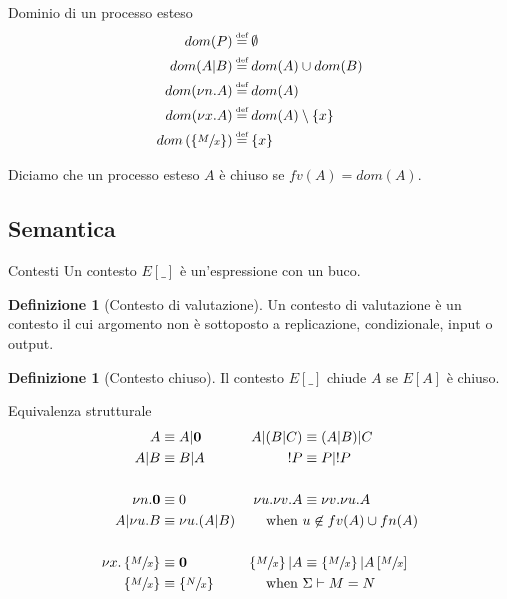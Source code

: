 \documentclass{beamer}
\newcounter{counter1}
\theoremstyle{plain}
\theoremstyle{definition}
\newtheorem{mydef}[counter1]{Definizione}
\theoremstyle{remark}
\newcommand{\set}[1]{\left\{#1\right\}}
\newcommand{\pa}[1]{\left(#1\right)}
\newcommand{\bra}[1]{\left[#1\right]}
\newcommand*{\eqdef}{\ensuremath{\overset{\mathclap{\text{\tiny def}}}{=}}}
\begin{document}
\begin{frame}{Dominio di un processo esteso}
  \begin{align*}
    dom(P) & \eqdef \emptyset \\
    dom(A|B) & \eqdef dom(A) \cup dom(B) \\
    dom(\nu n.A) & \eqdef dom(A) \\
    dom(\nu x.A) & \eqdef dom(A) \setminus \set{x}\\
    dom\pa{ \set{ \sfrac{M}{x}}} & \eqdef \set{x}           
  \end{align*}
  \vfill
  
  Diciamo che un processo esteso $A$ \`e chiuso se $fv(A) = dom(A)$.
\end{frame}

\subsection{Semantica}

\begin{frame}{Contesti}
  Un contesto $E[\_]$ \`e un'espressione con un buco.
  \begin{mydef}[Contesto di valutazione]
    Un contesto di valutazione \`e un contesto il cui argomento non
    \`e sottoposto a replicazione, condizionale, input o output.
  \end{mydef}
  \begin{mydef}[Contesto chiuso]
    Il contesto $E[\_]$ chiude $A$ se $E[A]$ \`e chiuso.
  \end{mydef}
\end{frame}


\begin{frame}{Equivalenza strutturale}
  \begin{align*}
    A & \equiv A|\mathbf{0} & A|(B|C) & \equiv (A|B)|C \\
    A|B & \equiv B|A & !P & \equiv P|!P \\ \\
    \nu n.\mathbf{0} & \equiv 0 & \nu u. \nu v.A & \equiv \nu v. \nu
                                                   u.A \\
    A| \nu u.B & \equiv \nu u. (A|B) & \text{when } & u\not\in fv(A)
                                                     \cup fn(A) \\ \\
    \nu x. \set{\sfrac{M}{x}} & \equiv \mathbf{0} & \set{\sfrac{M}{x}}
                                                    |A & \equiv
                                                         \set{\sfrac{M}{x}}
                                                         |
                                                         A\bra{\sfrac{M}{x}}
    \\
    \set{\sfrac{M}{x}} & \equiv \set{\sfrac{N}{x}} & \text{when } &
                                                                   \Sigma
                                                                   \vdash M=N
  \end{align*}
\end{frame}
\end{document}
